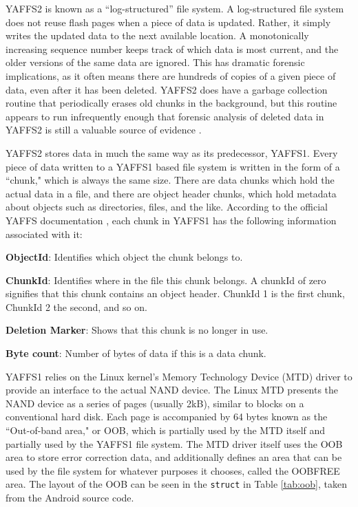 YAFFS2 is known as a ``log-structured'' file system.  A log-structured file system does not reuse flash pages when a piece of data is
updated.  Rather, it simply writes the updated data to the next available location.  A monotonically increasing sequence number
keeps track of which data is most current, and the older versions of the same data are ignored.  This has dramatic forensic
implications, as it often means there are hundreds of copies of a given piece of data, even after it has been deleted.  YAFFS2 does
have a garbage collection routine that periodically erases old chunks in the background, but this routine appears to run
infrequently enough that forensic analysis of deleted data in YAFFS2 is still a valuable source of evidence \cite{naval}. 

YAFFS2 stores data in much the same way as its predecessor, YAFFS1.  Every piece of data written to a YAFFS1 based file system is
written in the form of a ``chunk," which is always the same size.  There are data chunks which hold the actual data in a file, and
there are object header chunks, which hold metadata about objects such as directories, files, and the like.  According to the
official YAFFS documentation \cite{howyaffsworks}, each chunk in YAFFS1
has the following information associated with it:

\begin{itemize}
\begin{samepage}
\item {\bf ObjectId}: Identifies which object the chunk belongs to.\
\item {\bf ChunkId}: Identifies where in the file this chunk belongs. 
	A chunkId of zero signifies that this chunk contains an object header. 
	ChunkId 1 is the first chunk, ChunkId 2 the second, and so on.
\item {\bf Deletion Marker}: Shows that this chunk is no longer in use.
\item {\bf Byte count}: Number of bytes of data if this is a data chunk.
\end{samepage}
\end{itemize}

YAFFS1 relies on the Linux kernel's Memory Technology Device (MTD) driver to provide an interface to the actual NAND device.  The
Linux MTD presents the NAND device as a series of pages (usually 2kB), similar to blocks on a conventional hard disk.  Each page is
accompanied by 64 bytes known as the ``Out-of-band area," or OOB, which is partially used by the MTD itself and partially used by
the YAFFS1 file system. The MTD driver itself uses the OOB area to store error correction data, and additionally defines an area that
can be used by the file system for whatever purposes it chooses, called the OOBFREE area.  The layout of the OOB can be seen in the
\texttt{struct} in Table \ref{tab:oob}, taken from the Android source code. 

